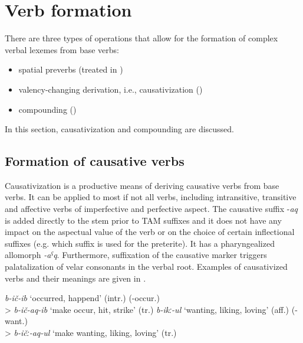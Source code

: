\chapter{Verb formation}
\label{cpt:verbformation}

There are three types of operations that allow for the formation of complex verbal lexemes from base verbs:
%
\begin{itemize}
	\item	spatial preverbs (treated in )
	\item	valency-changing derivation, i.e., causativization ()
	\item	compounding ()
\end{itemize}

In this section, causativization and compounding are discussed. 



\section{Formation of causative verbs}
\label{sec:Formation of causative verbs}
Causativization is a productive means of deriving causative verbs from base verbs. It can be applied to most if not all verbs, including intransitive, transitive and affective verbs of imperfective and perfective aspect. The causative suffix -\textit{aq} is added directly to the stem prior to TAM suffixes and it does not have any impact on the aspectual value of the verb or on the choice of certain inflectional suffixes (e.g. which suffix is used for the preterite). It has a pharyngealized allomorph \textit{-aˁq}. Furthermore, suffixation of the causative marker triggers palatalization of velar consonants in the verbal root. Examples of causativized verbs and their meanings are given in .

\begin{exe}
	\ex	\label{ex:causativizedVerbForms}
	\begin{xlist}
	\ex \textit{b-ič-ib} ‘occurred, happend' (intr.) (-occur.) \\
	> \textit{b-ič-aq-ib} ‘make occur, hit, strike' (tr.)
	\ex \textit{b-ikː-ul} ‘wanting, liking, loving' (aff.) (-want.) \\
	> \textit{b-ičː-aq-ul} ‘make wanting, liking, loving' (tr.)
		\end{xlist}
\end{exe}

